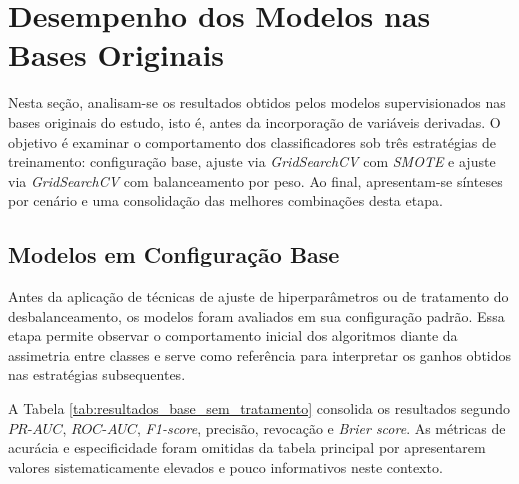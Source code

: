 
\section{Desempenho dos Modelos nas Bases Originais}
Nesta seção, analisam-se os resultados obtidos pelos modelos supervisionados nas bases originais do estudo, isto é, antes da incorporação de variáveis derivadas. O objetivo é examinar o comportamento dos classificadores sob três estratégias de treinamento: configuração base, ajuste via \textit{GridSearchCV} com \textit{SMOTE} e ajuste via \textit{GridSearchCV} com balanceamento por peso. Ao final, apresentam-se sínteses por cenário e uma consolidação das melhores combinações desta etapa.

\subsection{Modelos em Configuração Base}
Antes da aplicação de técnicas de ajuste de hiperparâmetros ou de tratamento do desbalanceamento, os modelos foram avaliados em sua configuração padrão. Essa etapa permite observar o comportamento inicial dos algoritmos diante da assimetria entre classes e serve como referência para interpretar os ganhos obtidos nas estratégias subsequentes.

A Tabela \ref{tab:resultados_base_sem_tratamento} consolida os resultados segundo $PR\text{-}AUC$, $ROC\text{-}AUC$, \textit{F1-score}, precisão, revocação e \textit{Brier score}. As métricas de acurácia e especificidade foram omitidas da tabela principal por apresentarem valores sistematicamente elevados e pouco informativos neste contexto.

\begingroup
\footnotesize
\setlength{\tabcolsep}{4pt}

